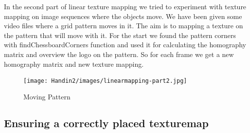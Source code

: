 In the second part of linear texture mapping we tried to experiment with texture mapping on image sequences where the objects move. We have been given some video files where a grid pattern moves in it. The aim is to mapping a texture on the pattern that will move with it. For the start we found the pattern corners with findChessboardCorners function and used it for calculating the homography matrix and overview the logo on the pattern. So for each frame we get a new homography matrix and new texture mapping.

\begin{figure}[h!]
	\centering
	\texttt{[image: Handin2/images/linearmapping-part2.jpg]}
	\caption{Moving Pattern}
	\label{fig:trace}
\end{figure}

\subsection{Ensuring a correctly placed texturemap}
